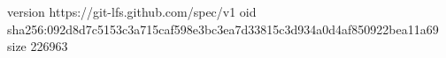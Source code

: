 version https://git-lfs.github.com/spec/v1
oid sha256:092d8d7c5153c3a715caf598e3bc3ea7d33815c3d934a0d4af850922bea11a69
size 226963
